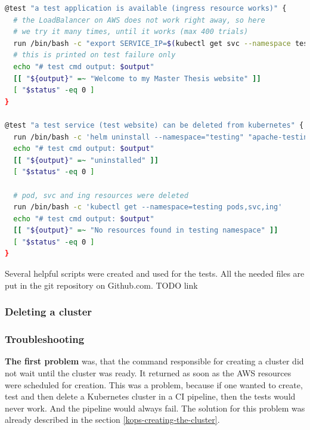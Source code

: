\begin{lstlisting}[basicstyle=\tiny,caption={TODO},captionpos=b,language=Bash,xleftmargin=1cm]
@test "a test application is available (ingress resource works)" {
  # the LoadBalancer on AWS does not work right away, so here
  # we try it many times, until it works (max 400 trials)
  run /bin/bash -c "export SERVICE_IP=$(kubectl get svc --namespace testing apache-testing --template '{{ range (index .status.loadBalancer.ingress 0) }}{{.}}{{ end }}') && chmod +x test-timeout-until.sh && ./test-timeout-until.sh \"curl --max-time 2 -L http://\$SERVICE_IP 2>/dev/null | grep 'Welcome to my Master Thesis website'\" \"400\" \"curl --max-time 2 -L http://\$SERVICE_IP 2>/dev/null | grep 'Welcome to my Master Thesis website'\""
  # this is printed on test failure only
  echo "# test cmd output: $output"
  [[ "${output}" =~ "Welcome to my Master Thesis website" ]]
  [ "$status" -eq 0 ]
}

@test "a test service (test website) can be deleted from kubernetes" {
  run /bin/bash -c 'helm uninstall --namespace="testing" "apache-testing" && kubectl delete -f config-map-www-contents.yaml && kubectl delete namespace "testing"'
  echo "# test cmd output: $output"
  [[ "${output}" =~ "uninstalled" ]]
  [ "$status" -eq 0 ]

  # pod, svc and ing resources were deleted
  run /bin/bash -c 'kubectl get --namespace=testing pods,svc,ing'
  echo "# test cmd output: $output"
  [[ "${output}" =~ "No resources found in testing namespace" ]]
  [ "$status" -eq 0 ]
}
\end{lstlisting}
Several helpful scripts were created and used for the tests. All the needed files are put in the git repository on Github.com. TODO link



\subsubsection{Deleting a cluster}

\subsubsection{Troubleshooting}

\textbf{The first problem} was, that the command responsible for creating a cluster did not wait until the cluster was ready. It returned as soon as the AWS resources were scheduled for creation. This was a problem, because if one wanted to create, test and then delete a Kubernetes cluster in a CI pipeline, then the tests would never work. And the pipeline would always fail. The solution for this problem was already described in the section \ref{kops-creating-the-cluster}.

